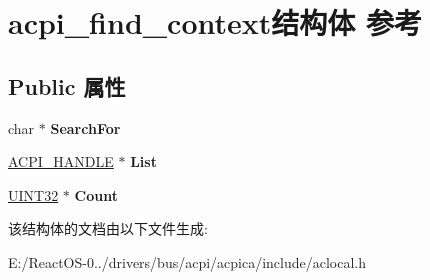 \hypertarget{structacpi__find__context}{}\section{acpi\+\_\+find\+\_\+context结构体 参考}
\label{structacpi__find__context}
\subsection*{Public 属性}
\begin{DoxyCompactItemize}
\item 
\mbox{\label{structacpi__find__context_a847d22a34d1974cbade1c415a6546378}} 
char $\ast$ {\bfseries Search\+For}
\item 
\mbox{\label{structacpi__find__context_a5e67e3e599e5fe868c993693881f9aaf}} 
\hyperlink{interfacevoid}{A\+C\+P\+I\+\_\+\+H\+A\+N\+D\+LE} $\ast$ {\bfseries List}
\item 
\mbox{\label{structacpi__find__context_a0192ad36181b7582532840f29d131762}} 
\hyperlink{_processor_bind_8h_ae1e6edbbc26d6fbc71a90190d0266018}{U\+I\+N\+T32} $\ast$ {\bfseries Count}
\end{DoxyCompactItemize}


该结构体的文档由以下文件生成\+:\begin{DoxyCompactItemize}
\item 
E\+:/\+React\+O\+S-\/0../drivers/bus/acpi/acpica/include/aclocal.\+h\end{DoxyCompactItemize}
